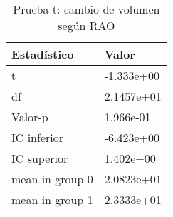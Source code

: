 \begin{table}[ht]
\centering
\caption{Prueba t: cambio de volumen según RAO} 
\label{tab:prueba_t_rao_volumen}
\begin{tabular}{ll}
  \hline
Estadístico & Valor \\ 
  \hline
t & -1.333e+00 \\ 
  df & 2.1457e+01 \\ 
  Valor-p & 1.966e-01 \\ 
  IC inferior & -6.423e+00 \\ 
  IC superior & 1.402e+00 \\ 
  mean in group 0 & 2.0823e+01 \\ 
  mean in group 1 & 2.3333e+01 \\ 
   \hline
\end{tabular}
\end{table}
